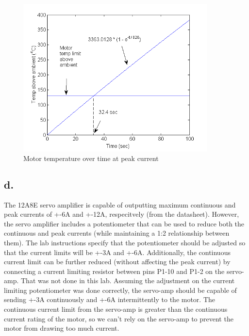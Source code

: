 \documentclass{article}
\theoremstyle{plain}
\theoremstyle{definition}
\theoremstyle{remark}
\begin{document}
\begin{figure}[htb]
\begin{center}
\includegraphics[width = 10cm]{temperature.png}
\caption{Motor temperature over time at peak current}
\label{temperature}
\end{center}
\end{figure}

\subsection*{d.}
The 12A8E servo amplifier is capable of outputting maximum continuous and peak currents of +-6A and +-12A, respecitvely (from the datasheet). However, the servo amplifier includes a potentiometer that can be used to reduce both the continuous and peak currents (while maintaining a 1:2 relationship between them). The lab instructions specify that the potentiometer should be adjusted so that the current limits will be +-3A and +-6A. Additionally, the continuous current limit can be further reduced (without affecting the peak current) by connecting a current limiting resistor between pins P1-10 and P1-2 on the servo-amp. That was not done in this lab. Assuming the adjustment on the current limiting potentiometer was done correctly, the servo-amp should be capable of sending +-3A continuously and +-6A intermittently to the motor. The continuous current limit from the servo-amp is greater than the continuous current rating of the motor, so we can't rely on the servo-amp to prevent the motor from drawing too much current.
\vspace{3 mm}
\end{document}
